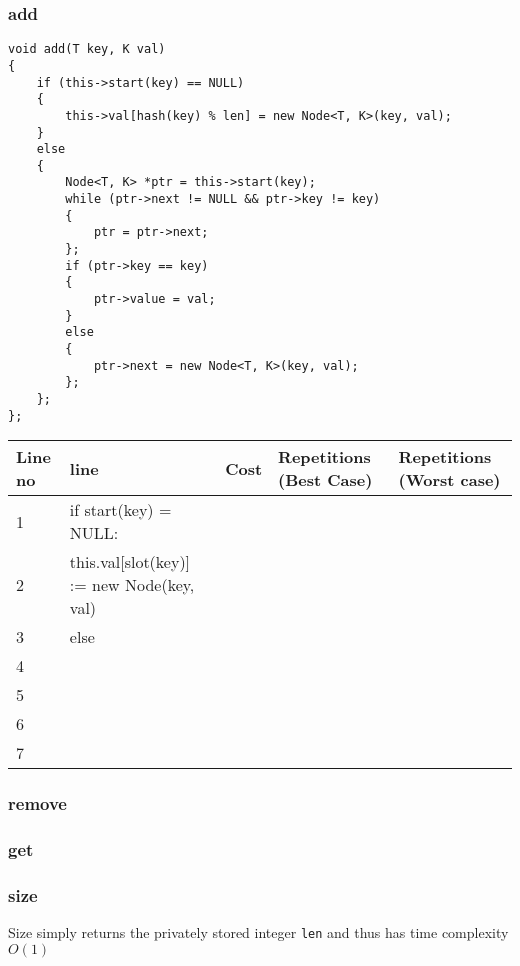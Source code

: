 \documentclass{article}
\newcommand\tab[1][0.4cm]{\hspace*{#1}}
\newcounter{Label}
\begin{document}
\subsubsection{add}

\begin{verbatim}
void add(T key, K val)
{
    if (this->start(key) == NULL)
    {
        this->val[hash(key) % len] = new Node<T, K>(key, val);
    }
    else
    {
        Node<T, K> *ptr = this->start(key);
        while (ptr->next != NULL && ptr->key != key)
        {
            ptr = ptr->next;
        };
        if (ptr->key == key)
        {
            ptr->value = val;
        }
        else
        {
            ptr->next = new Node<T, K>(key, val);
        };
    };
};
\end{verbatim}

\setcounter{Label}{0}%
\begin{tabular}{|l|l|l|l|l|}
\hline
 Line no & line & Cost & Repetitions (Best Case) & Repetitions (Worst case)\\
 \hline
 1 & if start(key) = NULL:  & & \\
 2 & \tab this.val[slot(key)] := new Node(key, val) & &\\
 3 & else  & &\\
 4 &  & &\\
 5 &  & &\\
 6 &  & &\\
 7 &  & &\\
 \hline
\end{tabular}

\subsubsection{remove}

\subsubsection{get}

\subsubsection{size}

Size simply returns the privately stored integer \texttt{len} and thus has time complexity $O(1)$
\end{document}
